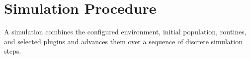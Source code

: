 \section{Simulation Procedure}
\label{app:simulator}

A simulation combines the configured environment, initial population, routines, and selected plugins and advances them over a sequence of discrete simulation steps. 

